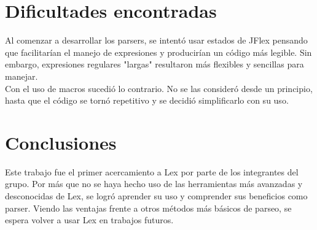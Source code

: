 \documentclass[a4paper, 10pt]{article}
\begin{document}
\section{Dificultades encontradas}

Al comenzar a desarrollar los parsers, se intentó usar estados de JFlex pensando que facilitarían el manejo de expresiones y producirían un código más legible. Sin embargo, expresiones regulares "largas" resultaron más flexibles y sencillas para manejar.\\

Con el uso de macros sucedió lo contrario. No se las consideró desde un principio, hasta que el código se tornó repetitivo y se decidió simplificarlo con su uso.

\section{Conclusiones}
Este trabajo fue el primer acercamiento a Lex por parte de los integrantes del grupo. Por más que no se haya hecho uso de las herramientas más avanzadas y desconocidas de Lex, se logró aprender su uso y comprender sus beneficios como parser. Viendo las ventajas frente a otros métodos más básicos de parseo, se espera volver a usar Lex en trabajos futuros. 
\end{document}
